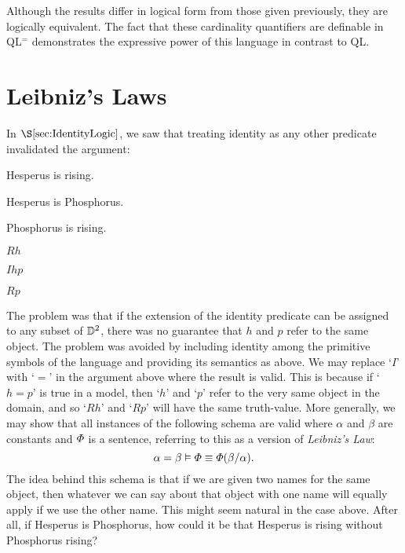 Although the results differ in logical form from those given previously, they are logically equivalent.
The fact that these cardinality quantifiers are definable in QL$^=$ demonstrates the expressive power of this language in contrast to QL. 




\section{Leibniz's Laws}

In $\S\ref{sec:IdentityLogic}$, we saw that treating identity as any other predicate invalidated the argument:

\begin{multicols}{2}
  
\begin{earg}
  \item[] Hesperus is rising.
  \item[] Hesperus is Phosphorus.
  \item[\therefore] Phosphorus is rising.
\end{earg}

\begin{earg}
  \item[] $Rh$
  \item[] $Ihp$
  \item[\therefore] $Rp$
\end{earg}

\end{multicols}

The problem was that if the extension of the identity predicate can be assigned to any subset of $\mathbb{D}^2$, there was no guarantee that $h$ and $p$ refer to the same object.
The problem was avoided by including identity among the primitive symbols of the language and providing its semantics as above.
We may replace `$I$' with `$=$' in the argument above where the result is valid.
This is because if `$h=p$' is true in a model, then `$h$' and `$p$' refer to the very same object in the domain, and so `$Rh$' and `$Rp$' will have the same truth-value.
More generally, we may show that all instances of the following schema are valid where $\alpha$ and $\beta$ are constants and $\varPhi$ is a sentence, referring to this as a version of \textit{Leibniz's Law}:
  $$\alpha=\beta \vDash \varPhi \equiv \varPhi(\beta/\alpha).$$
The idea behind this schema is that if we are given two names for the same object, then whatever we can say about that object with one name will equally apply if we use the other name.
This might seem natural in the case above.
After all, if Hesperus is Phosphorus, how could it be that Hesperus is rising without Phosphorus rising?

